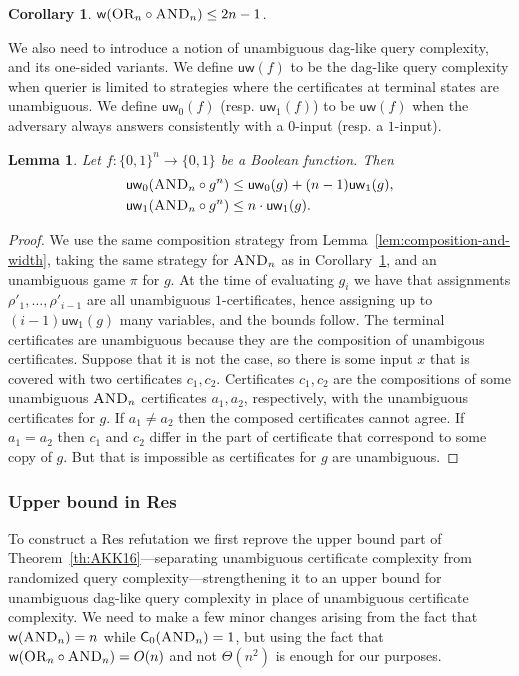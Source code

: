 \documentclass[11pt]{article}
\newcommand{\scterm}[1]{{\textrm{\sc #1}}}
\newcommand{\res}{\scterm{Res}}
\newcommand{\AND}{{\scterm{AND}}}
\newcommand{\OR}{{\scterm{OR}}}
\newcommand{\dagw}{\mathsf{w}}
\newcommand{\cert}{\mathsf{C}}
\newcommand{\uw}{\mathsf{uw}}
\newcommand{\set}[1]{\{#1\}}
\numberwithin{equation}{section}
\newtheorem{lemma}[theorem]{Lemma}
\newtheorem{corollary}[theorem]{Corollary}
\begin{document}
\begin{corollary}
  \label{cor:width-or-and}
  $\dagw(\OR_n \circ \AND_n) \leq 2n-1$.
\end{corollary}

We also need to introduce a notion of unambiguous dag-like query complexity, and its one-sided variants. We define $\uw(f)$ to be the dag-like query complexity when querier is limited to strategies where the certificates at terminal states are unambiguous. We define $\uw_0(f)$ (resp. $\uw_1(f)$) to be $\uw(f)$ when the adversary always answers consistently with a $0$-input (resp. a $1$-input).

\begin{lemma}
  \label{lem:uw-and}
  Let $f\colon \set{0,1}^n\to\set{0,1}$ be a Boolean function. Then
  \begin{align*}
  \uw_0(\AND_n \circ g^n) &\leq \uw_0(g) + (n-1)\uw_1(g), \\
  \uw_1(\AND_n \circ g^n) &\leq n \cdot \uw_1(g).
  \end{align*}
\end{lemma}

\begin{proof}
  We use the same composition strategy from Lemma~\ref{lem:composition-and-width}, taking the
  same strategy for $\AND_n$ as in Corollary~\ref{cor:width-or-and}, and an unambiguous game $\pi$ for $g$. At the time of evaluating $g_i$ we have that assignments $\rho'_1,\dotsc,\rho'_{i-1}$ are all unambiguous $1$-certificates, hence assigning up to $(i-1)\uw_1(g)$ many variables, and the bounds follow. The terminal certificates are unambiguous because they are the composition of unambigous certificates. 
  Suppose that it is not the case, so there is some input $x$ that is covered with two certificates $c_1, c_2$.
  Certificates $c_1, c_2$ are the compositions of some unambiguous $\AND_n$ certificates $a_1, a_2$, respectively, 
  with the unambiguous certificates for $g$.
  If $a_1 \neq a_2$ then the composed certificates cannot agree. If $a_1 = a_2$ then $c_1$ and $c_2$ differ in the part of certificate that correspond to some copy of $g$. But that is impossible as certificates for $g$ are unambiguous.
\end{proof}

\subsubsection{Upper bound in {\res}}

To construct a {\res} refutation we first reprove the upper bound part of Theorem~\ref{th:AKK16}---separating unambiguous certificate complexity from randomized query complexity---strengthening it to an upper bound for unambiguous dag-like query complexity in place of unambiguous certificate complexity. We need to make a few minor changes arising from the fact that $\dagw(\AND_n)=n$ while $\cert_0(\AND_n)=1$, but using the fact that $\dagw(\OR_n \circ \AND_n)=O(n)$ and not $\Theta(n^2)$ is enough for our purposes.
\end{document}
